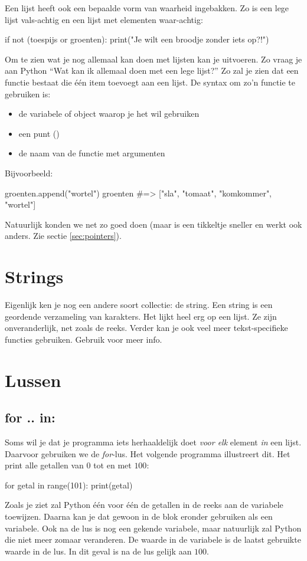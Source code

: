   Een lijst heeft ook een bepaalde vorm van waarheid ingebakken. Zo is een lege
  lijst vals-achtig en een lijst met elementen waar-achtig:
  \begin{python}
    if not (toespijs or groenten):
      print("Je wilt een broodje zonder iets op?!")
  \end{python}
  Om te zien wat je nog allemaal kan doen met lijsten kan je 
  uitvoeren. Zo vraag je aan Python ``Wat kan ik allemaal doen met een lege
  lijst?'' Zo zal je zien dat een functie  bestaat die \'e\'en item
  toevoegt aan een lijst. De syntax om zo'n functie te gebruiken is:
  \begin{itemize}
  \item de variabele of object waarop je het wil gebruiken
  \item een punt ()
  \item de naam van de functie met argumenten
  \end{itemize}
  Bijvoorbeeld:
  \begin{python}
    groenten.append("wortel")
    groenten #=> ["sla", "tomaat", "komkommer", "wortel"]
  \end{python}
  Natuurlijk konden we net zo goed  doen (maar
   is een tikkeltje sneller en werkt ook anders. Zie sectie
  \ref{sec:pointers}).

\section{Strings}
  Eigenlijk ken je nog een andere soort collectie: de string. Een string is een
  geordende verzameling van karakters. Het lijkt heel erg op een lijst. Ze zijn
  onveranderlijk, net zoals de reeks. Verder kan je ook veel meer
  tekst-specifieke functies gebruiken. Gebruik  voor
  meer info.


\section{Lussen}
  \subsection{for .. in:}
  Soms wil je dat je programma iets herhaaldelijk doet \emph{voor elk} element
  \emph{in} een lijst. Daarvoor gebruiken we de \emph{for}-lus. Het volgende
  programma illustreert dit. Het print alle getallen van $0$ tot en met $100$:
  \begin{python}
    for getal in range(101):
      print(getal)
  \end{python}
  Zoals je ziet zal Python \'e\'en voor \'e\'en de getallen in de reeks aan de
  variabele  toewijzen. Daarna kan je dat gewoon in de blok eronder
  gebruiken als een variabele. Ook na de lus is  nog een gekende
  variabele, maar natuurlijk zal Python die niet meer zomaar veranderen. De
  waarde in de variabele is de laatst gebruikte waarde in de lus. In dit
  geval is  na de lus gelijk aan $100$.

